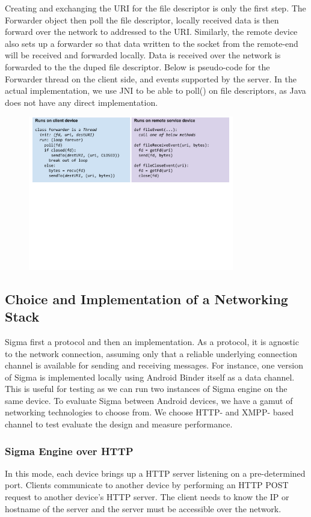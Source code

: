 \documentclass[prodmode]{acmlarge}
\begin{document}
Creating and exchanging the URI for the file descriptor is only the first step. The Forwarder object then poll the file descriptor, locally received data is then forward over the network to addressed to the URI. Similarly, the remote device also sets up a forwarder so that data written to the socket from the remote-end will be received and forwarded locally. Data is received over the network is forwarded to the the duped file descriptor. Below is pseudo-code for the Forwarder thread on the client side, and events supported by the server. In the actual implementation, we use JNI to be able to poll() on file descriptors, as Java does not have any direct implementation.
\begin{figure}[h]
\centering
\includegraphics[width=0.8\textwidth]{drawings/forwardFds.pdf}
\end{figure}

\subsection{Choice and Implementation of a Networking Stack}
Sigma first a protocol and then an implementation. As a protocol, it is agnostic to the network connection, assuming only that a reliable underlying connection channel is available for sending and receiving messages. For instance, one version of Sigma is implemented locally using Android Binder itself as a data channel. This is useful for testing as we can run two instances of Sigma engine on the same device. To evaluate Sigma between Android devices, we have a gamut of networking technologies to choose from. We choose HTTP- and XMPP- based channel to test evaluate the design and measure performance.

\subsubsection{Sigma Engine over HTTP}
In this mode, each device brings up a HTTP server listening on a pre-determined port. Clients communicate to another device by performing an HTTP POST request to another device's HTTP server. The client needs to know the IP or hostname of the server and the server must be accessible over the network.
\end{document}

